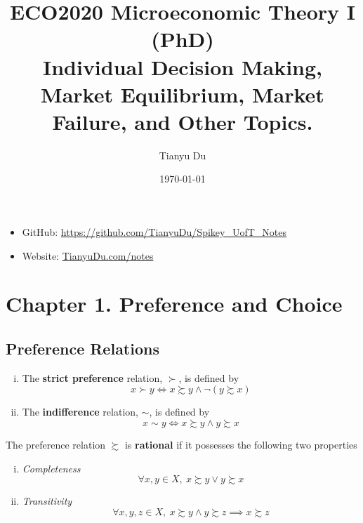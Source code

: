 \documentclass{article}
\title{ECO2020 Microeconomic Theory I (PhD) \\ \small Individual Decision Making, Market Equilibrium, Market Failure, and Other Topics.}
\date{\today}
\author{Tianyu Du}
\begin{document}
	\maketitle
	\doclicenseThis
	\begin{itemize}
		\item GitHub: \url{https://github.com/TianyuDu/Spikey_UofT_Notes}
		\item Website: \url{TianyuDu.com/notes}
	\end{itemize}
	\tableofcontents
	\newpage
	
	\section{Chapter 1. Preference and Choice}
	\subsection{Preference Relations}
	
		\begin{definition} \quad
			\begin{enumerate}[(i)]
				\item The \textbf{strict preference} relation, $\succ$, is defined by
					\begin{equation}
						x \succ y \iff x \succsim y \land \neg (y \succsim x)
					\end{equation}
				\item The \textbf{indifference} relation, $\sim$, is defined by
					\begin{equation}
						x \sim y \iff x \succsim y \land y \succsim x
					\end{equation}
			\end{enumerate}
		\end{definition}
	
		\begin{definition}[1.B.1]
			The preference relation $\succsim$ is \textbf{rational} if it possesses the following two properties
			\begin{enumerate}[(i)]
				\item \emph{Completeness} 
					\begin{equation}
						\forall x, y \in X,\ x \succsim y \lor y \succsim x
					\end{equation}
				\item \emph{Transitivity}
					\begin{equation}
						\forall x, y, z \in X,\ x \succsim y \land y \succsim z \implies x \succsim z
					\end{equation}
			\end{enumerate}
		\end{definition}
	
\end{document}

